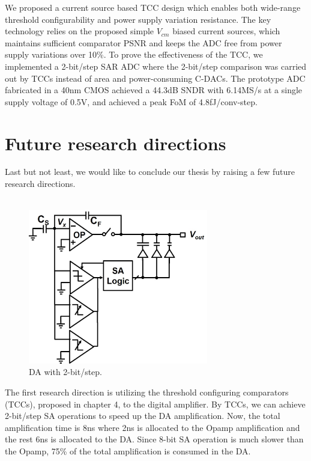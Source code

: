 We proposed a current source based TCC design which enables both wide-range threshold configurability and power supply variation resistance. 
The key technology relies on the proposed simple $V_{cm}$ biased current sources, which maintains sufficient comparator PSNR and keeps the ADC free from power supply variations over 10\%. 
To prove the effectiveness of the TCC, we implemented a 2-bit/step SAR ADC where the 2-bit/step comparison was carried out by TCCs instead of area and power-consuming C-DACs.
The prototype ADC fabricated in a 40nm CMOS achieved a 44.3dB SNDR with 6.14MS/s at a single supply voltage of 0.5V, and achieved a peak FoM of 4.8fJ/conv-step.


\section{Future research directions}
Last but not least, we would like to conclude our thesis by raising a few future research directions.
\\
\\
\begin{figure}
\centering
  \includegraphics[width=0.7\textwidth]{figure/chap5/2bitstep.jpg}
  \caption{DA with 2-bit/step.}
  \label{fig-2bitste}
\end{figure}
The first research direction is utilizing the threshold configuring comparators (TCCs), proposed in chapter 4, to the digital amplifier.
By TCCs, we can achieve 2-bit/step SA operations to speed up the DA amplification.
Now, the total amplification time is 8ns where 2ns is allocated to the Opamp amplification and the rest 6ns is allocated to the DA.
Since 8-bit SA operation is much slower than the Opamp, 75\% of the total amplification is consumed in the DA.
